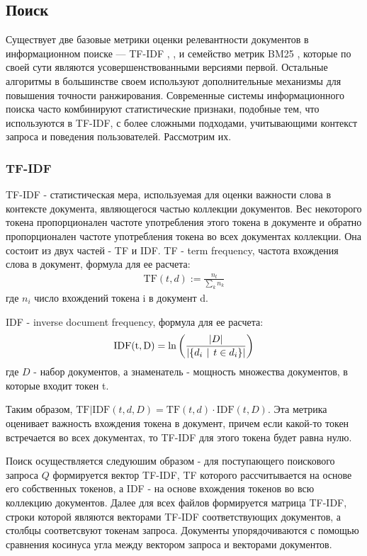 \subsection{Поиск}
Существует две базовые метрики оценки релевантности документов в информационном поиске — TF-IDF \cite{ctan2}, \cite{ctan1}, \cite{ctan} и 
семейство метрик BM25 \cite{bm1} \cite{bm2}, которые по 
своей сути являются усовершенствованными версиями первой. Остальные алгоритмы в большинстве своем используют дополнительные механизмы 
для повышения точности ранжирования. 
Современные системы информационного поиска часто комбинируют статистические признаки, подобные тем, что используются в TF-IDF, с
более сложными подходами, учитывающими контекст запроса и поведения пользователей. Рассмотрим их. 

\subsubsection{TF-IDF}
TF-IDF - статистическая мера, используемая для оценки важности слова в контексте документа, являющегося частью коллекции документов. 
Вес некоторого токена пропорционален частоте употребления этого токена в документе и обратно пропорционален частоте употребления токена 
во всех документах коллекции. Она состоит из двух частей - TF и IDF. TF - term frequency, частота 
вхождения слова в документ, формула для ее расчета:
\begin{align*}
    \mathrm{TF}(t, d) := \frac{n_t}{\sum_k n_k}
\end{align*}
где $n_i$ число вхождений токена i в документ d.

IDF - inverse document frequency, формула для ее расчета:
\begin{align*}
    \mathrm{IDF(t, D)} = \ln\left(\frac{|D|}{|\{d_i \hspace{4pt} | \hspace{4pt} t \in d_i\}|}\right)
\end{align*}
где $D$ - набор документов, а знаменатель - мощность множества документов, в которые входит
токен t. 

Таким образом, $\mathrm{TF|IDF}(t, d, D) = \mathrm{TF}(t, d) \cdot \mathrm{IDF}(t, D)$.
Эта метрика оценивает важность вхождения токена в документ, причем если какой-то токен встречается во всех документах, 
то TF-IDF для этого токена будет равна нулю.

Поиск осуществляется следуюшим образом - для поступающего поискового запроса $Q$ формируется
вектор TF-IDF, TF которого рассчитывается на основе его собственных токенов, а IDF - на 
основе вхождения токенов во всю коллекцию документов. Далее для всех файлов 
формируется матрица TF-IDF, строки которой являются векторами TF-IDF соответствующих документов, а столбцы
соответсвуют токенам запроса. Документы упорядочиваются с помощью сравнения косинуса угла между вектором запроса и векторами 
документов. 


